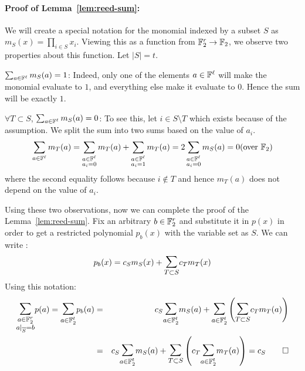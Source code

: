 \paragraph{Proof of Lemma~\ref{lem:reed-sum}:}
We will create a special notation for the monomial indexed by a subset $S$ as $m_S(x) = \prod_{i \in S} x_i$. Viewing this as a function from ${\mathbb{F}}_2^r \to {\mathbb{F}}_2$, we observe two properties about this function. Let $|S| = t$.
\begin{description}
\item{$\sum_{a \in {\mathbb{F}}^\ell} m_S(a) = 1$:} Indeed, only one of the elements $a \in {\mathbb{F}}^\ell$ will make the monomial evaluate to $1$, and everything else make it evaluate to $0$. Hence the sum will be exactly $1$.
\item{$\forall T \subset S$, $\sum_{a \in {\mathbb{F}}^\ell} m_S(a) = 0$:} To see this, let $i \in S \setminus T$ which exists because of the assumption. We split the sum into two sums based on the value of $a_i$.
$$\sum_{a \in {\mathbb{F}}^\ell} m_T(a) = \sum_{\substack{a \in {\mathbb{F}}^\ell \\ a_i = 0}} m_T(a) + \sum_{\substack{a \in {\mathbb{F}}^\ell \\ a_i = 1}} m_T(a) = 2 \sum_{\substack{a \in {\mathbb{F}}^\ell \\ a_i = 0}} m_S(a) = 0 (\textrm{over ${\mathbb{F}}_2$}) $$
where the second equality follows because $i \notin T$ and hence $m_T(a)$ does not depend on the value of $a_i$.
\end{description}
Using these two observations, now we can complete the proof of the Lemma~\ref{lem:reed-sum}. Fix an arbitrary $b \in {\mathbb{F}}_2^r$ and substitute it in $p(x)$ in order to get a restricted polynomial $p_b(x)$ with the variable set as $S$. We can write :
$$ p_b(x) = c_S m_S(x) + \bigsum_{T \subset S} c_T m_T(x)$$
Using this notation:
\begin{eqnarray*}
\bigsum_{\substack{a \in \F_2^r \\ a|_{\overline{S}} = b}} p(a) = \bigsum_{a \in \F_2^t} p_b(a) & = & c_S \bigsum_{a \in \F_2^t} m_S(a) + \bigsum_{a \in \F_2^t} \left( \bigsum_{T \subset S} c_T m_T(a) \right) \\
& = & c_S \bigsum_{a \in \F_2^t} m_S(a) +  \bigsum_{T \subset S}  \left( c_T \bigsum_{a \in \F_2^t} m_T(a) \right) =  c_S \qed \\
\end{eqnarray*}